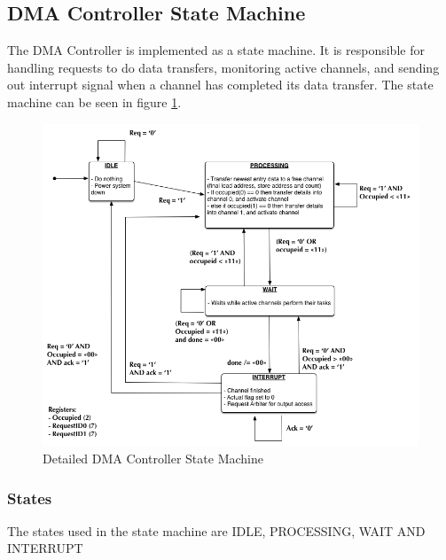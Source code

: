 \begin{appendix}
\subsection{DMA Controller State Machine}

The DMA Controller is implemented as a state machine.
It is responsible for handling requests to do data transfers, monitoring active channels, and sending out interrupt signal when a channel has completed its data transfer.
The state machine can be seen in figure \ref{fig:DMAControllerStateMachine}.

\begin{figure}[htb]
    \centering
    \includegraphics[width=1\textwidth]{Figures/DMA/StateMachineFinal}
    \caption{Detailed DMA Controller State Machine}
    \label{fig:DMAControllerStateMachine}
\end{figure}

\subsubsection{States}
The states used in the state machine are IDLE, PROCESSING, WAIT AND INTERRUPT


\end{appendix}
